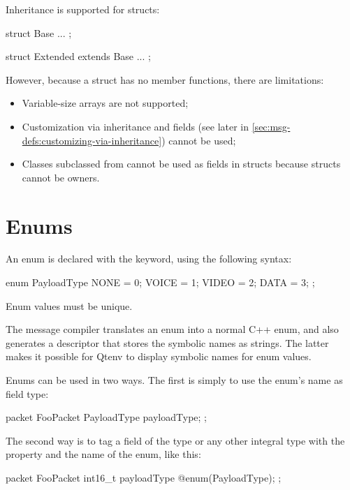 Inheritance is supported for structs:

\begin{msg}
struct Base
{
    ...
};

struct Extended extends Base
{
    ...
};
\end{msg}

However, because a struct has no member functions, there are limitations:

\begin{itemize}
   \item Variable-size arrays are not supported;
   \item Customization via inheritance and  fields
      (see later in \ref{sec:msg-defs:customizing-via-inheritance})
      cannot be used;
   \item Classes subclassed from  cannot be used as fields in structs
      because structs cannot be owners.
\end{itemize}


\section{Enums}
\label{sec:msg-defs:enums}

An enum is declared with the  keyword, using the following
syntax:

\begin{msg}
enum PayloadType
{
   NONE = 0;
   VOICE = 1;
   VIDEO = 2;
   DATA = 3;
};
\end{msg}

Enum values must be unique.

The message compiler translates an enum into a normal C++ enum, and also
generates a descriptor that stores the symbolic names as strings. The latter
makes it possible for Qtenv to display symbolic names for enum values.

Enums can be used in two ways. The first is simply to use the enum's name as
field type:

\begin{msg}
packet FooPacket
{
    PayloadType payloadType;
};
\end{msg}

The second way is to tag a field of the type  or any
other integral type with the  property and the name of
the enum, like this:

\begin{msg}
packet FooPacket
{
    int16_t payloadType @enum(PayloadType);
};
\end{msg}


